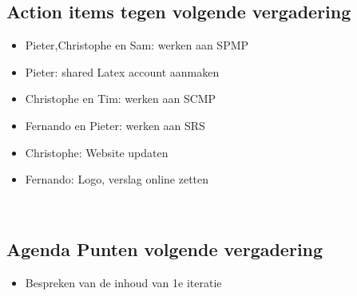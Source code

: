 \subsection{Action items tegen volgende vergadering}
\begin{itemize}
	\item Pieter,Christophe en Sam: werken aan SPMP
	\item Pieter: shared Latex account aanmaken
	\item Christophe en Tim: werken aan SCMP 
	\item Fernando en Pieter: werken aan SRS
	\item Christophe: Website updaten
	\item Fernando: Logo, verslag online zetten
\end{itemize}
\mbox{} 
\\
\subsection{Agenda Punten volgende vergadering}
\begin{itemize}
	\item Bespreken van de inhoud van 1e iteratie
\end{itemize}
